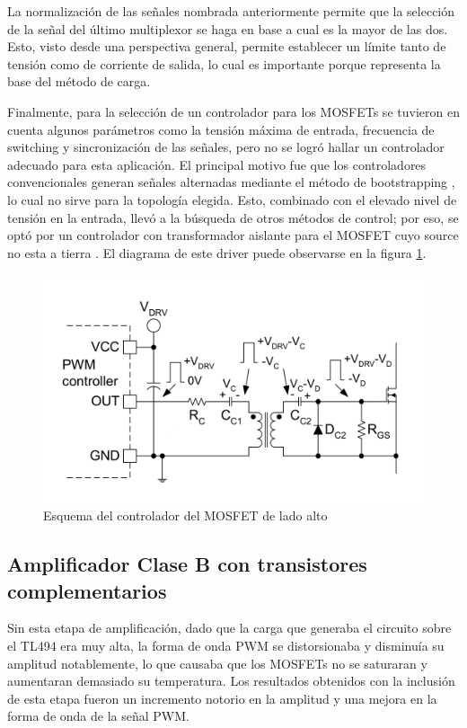 La normalización de las señales nombrada anteriormente permite que la selección de la señal del último multiplexor
se haga en base a cual es la mayor de las dos. Esto, visto desde una perspectiva general, permite establecer un límite
tanto de tensión como de corriente de salida, lo cual es importante porque representa la base del método de carga.

Finalmente, para la selección de un controlador para los MOSFETs se tuvieron en cuenta algunos parámetros como
la tensión máxima de entrada, frecuencia de switching y sincronización de las señales,
pero no se logró hallar un controlador adecuado para esta aplicación.
El principal motivo fue que los controladores convencionales generan señales alternadas mediante el método de bootstrapping \cite{hart},
lo cual no sirve para la topología elegida. Esto, combinado con el elevado nivel de tensión en la entrada,
llevó a la búsqueda de otros métodos de control; por eso, se optó por un controlador con transformador aislante para el MOSFET cuyo source no esta a tierra \cite{gatedrivers}. El diagrama de este driver puede observarse en la figura \ref{fig:driver}.

\begin{figure}
    \centering
    \includegraphics[width=\textwidth]{images/esquema_driver.png}
    \caption{Esquema del controlador del MOSFET de lado alto}
    \label{fig:driver}
\end{figure}

\subsection{Amplificador Clase B con transistores complementarios}

Sin esta etapa de amplificación, dado que la carga que generaba el circuito sobre el TL494 era muy alta, 
la forma de onda PWM se distorsionaba y disminuía su amplitud notablemente, lo que causaba que los MOSFETs no se saturaran y aumentaran demasiado su temperatura.
Los resultados obtenidos con la inclusión de esta etapa fueron un incremento notorio en la amplitud y una mejora en la forma de onda de la señal PWM.

